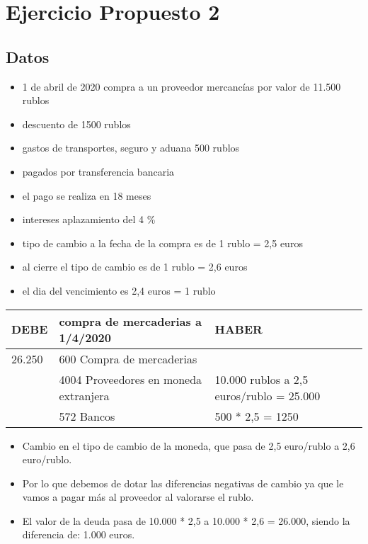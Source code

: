 \documentclass[a4paper,12pt]{article}
\begin{document}
\section{Ejercicio Propuesto 2}
\subsection*{Datos}
\begin{itemize}
    \item 1 de abril de 2020 compra a un proveedor mercancías por valor de 11.500 rublos
    \item descuento de 1500 rublos
    \item gastos de transportes, seguro y aduana 500 rublos
    \item pagados por transferencia bancaria
    \item el pago se realiza en 18 meses
    \item intereses aplazamiento del 4 \%
    \item tipo de cambio a la fecha de la compra es de 1 rublo = 2,5 euros
    \item al cierre el tipo de cambio es de 1 rublo = 2,6 euros
    \item el dia del vencimiento es 2,4 euros = 1 rublo
\end{itemize}

\begin{table}[H]
    \centering
    \begin{tabular}{|p{3cm}|p{6cm}|p{3cm}|}
    \hline
    \textbf{DEBE} & \textbf{compra de mercaderias a 1/4/2020} & \textbf{HABER} \\
    \hline
    26.250& 600 Compra de mercaderias& \\
    \hline
    & 4004 Proveedores en moneda extranjera& 10.000 rublos a 2,5 euros/rublo = 25.000\\
    \hline
    & 572 Bancos & 500 * 2,5 = 1250\\
    \hline
    \end{tabular}
\end{table}
\begin{itemize}
    \item Cambio en el tipo de cambio de la moneda, que pasa de 2,5 euro/rublo a 2,6 euro/rublo.
    \item Por lo que debemos de dotar las diferencias negativas de cambio ya que le vamos a pagar más al proveedor al valorarse el rublo.
    \item El valor de la deuda pasa de 10.000 * 2,5 a 10.000 * 2,6 = 26.000, siendo la diferencia de: 1.000 euros.
\end{itemize}
\end{document}
